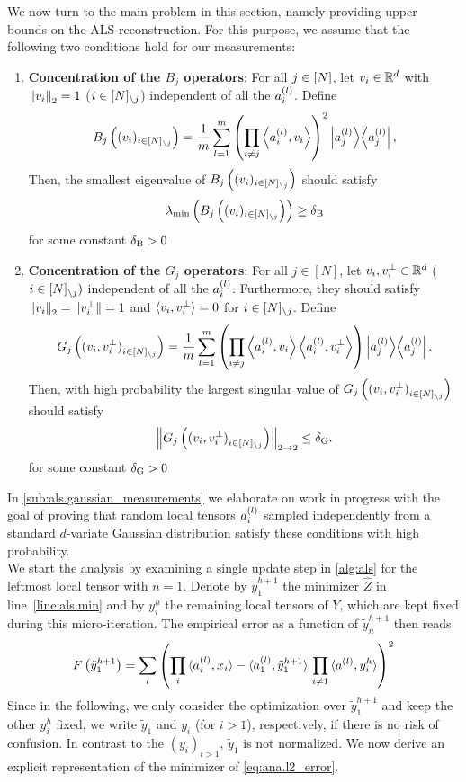 We now turn to the main problem in this section, namely providing upper bounds on the ALS-reconstruction.
For this purpose, we assume that the following two conditions hold for our measurements:
\begin{enumerate}
  \item\label{lbl:conditions.B}\textbf{Concentration of the $B_j$ operators}:
    For all $j \in [N]$, let $v_i \in {\mathbb{R}}^d$ with ${\Vert v_i\Vert}_2 = 1$ ($i \in [N]_{\setminus {j}}$) independent of all the $a^{(l)}_i$.
    Define
    \[
      \label{eq:ana.conditions.B}
      B_j\left((v_i)_{i \in [N]_{\setminus {j}}}\right)
      = \frac{1}{m} \sum_{l=1}^m \left( \prod_{i\neq j} \Braket{a^{(l)}_i, v_i} \right)^2 \left| a_j^{(l)} \middle\rangle\middle\langle a_j^{(l)} \right|,
    \]
    Then, the smallest eigenvalue of $B_j\left((v_i)_{i \in [N]_{\setminus {j}}}\right)$ should satisfy
    \[
      \label{eq:ana.conditions.lmin}
      \lambda_\mathrm{min}\left(B_j\left((v_i)_{i \in [N]_{\setminus {j}}}\right)\right) \ge \delta_\mathrm{B}
    \]
    for some constant $\delta_\mathrm{B} > 0$
  \item\label{lbl:conditions.G}\textbf{Concentration of the $G_j$ operators}:
    For all $j \in [N]$, let $v_i, v_i^\perp \in {\mathbb{R}}^d$ ($i \in [N]_{\setminus {j}})$ independent of all the $a^{(l)}_i$.
    Furthermore, they should satisfy ${\Vert v_i\Vert}_2 = {\Vert v_i^\perp\Vert}= 1$ and $\braket{v_i, v_i^\perp} = 0$ for $i\in[N]_{\setminus {j}}$.
    Define
    \[
      \label{eq:ana.conditions.G}
      G_j\left({(v_i, v_i^\perp)}_{i \in [N]_{\setminus {j}}} \right)
      = \frac{1}{m} \sum_{l=1}^m \left( \prod_{i\neq j} \Braket{a^{(l)}_i, v_i} \Braket{a^{(l)}_i, v_i^\perp} \right) \left| a_j^{(l)} \middle\rangle\middle\langle a_j^{(l)} \right|.
    \]
    Then, with high probability the largest singular value of $G_j\left({(v_i, v_i^\perp)}_{i \in [N]_{\setminus {j}}} \right)$ should satisfy
    \[
      \label{eq:ana.conditions.lmax}
      {\left\Vert G_j\left({(v_i, v_i^\perp)}_{i \in [N]_{\setminus {j}}} \right)\right\Vert}_{2 \to 2} \le \delta_\mathrm{G}.
    \]
    for some constant $\delta_\mathrm{G} > 0$
\end{enumerate}
In \cref{sub:als.gaussian_measurements} we elaborate on work in progress with the goal of proving that random local tensors $a^{(l)}_i$ sampled independently from a standard $d$-variate Gaussian distribution satisfy these conditions with high probability.\\


We start the analysis by examining a single update step in \cref{alg:als} for the leftmost local tensor with $n = 1$.
Denote by $\tilde y^{h+1}_1$ the minimizer $\hat Z$ in line~\ref{line:als.min} and by $y^h_i$ the remaining local tensors of $Y$, which are kept fixed during this micro-iteration.
The empirical error as a function of $\tilde y^{h+1}_n$ then reads
\[
  F\left(\tilde y^{h+1}_1\right)
  = \sum_l {\left(  \prod_i \braket{a^{(l)}_i, x_i} - \braket{a^{(l)}_1, \tilde y^{h+1}_1} \, \prod_{i \neq 1} \braket{a^{(l)}, y^{h}_i} \right)}^2
  \label{eq:ana.l2_error}
\]
Since in the following, we only consider the optimization over $\tilde y^{h+1}_1$ and keep the other $y^h_i$ fixed, we write $\tilde y_1$ and $y_i$ (for $i > 1$), respectively, if there is no risk of confusion.
In contrast to the $(y_i)_{i > 1}$, $\tilde y_1$ is not normalized.
We now derive an explicit representation of the minimizer of \cref{eq:ana.l2_error}.

